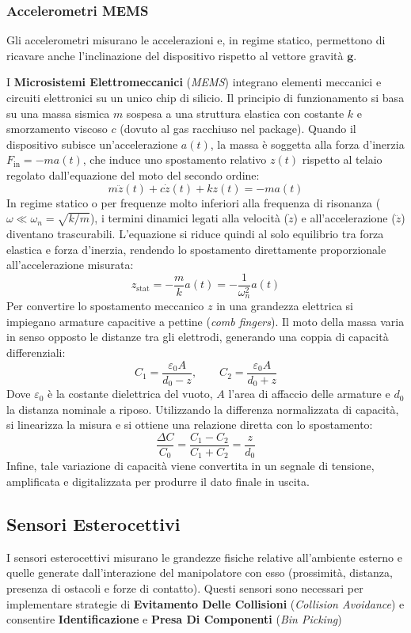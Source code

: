 ﻿\documentclass[11pt, a4paper]{article}
\begin{document}
\subsubsection{Accelerometri MEMS}
Gli accelerometri misurano le accelerazioni e, in regime statico, permettono di ricavare anche l'inclinazione del dispositivo rispetto al vettore gravità $\boldsymbol{g}$.

I \textbf{Microsistemi Elettromeccanici} (\textit{MEMS}) integrano elementi meccanici e circuiti elettronici su un unico chip di silicio. Il principio di funzionamento si basa su una massa sismica $m$ sospesa a una struttura elastica con costante $k$ e smorzamento viscoso $c$ (dovuto al gas racchiuso nel package). Quando il dispositivo subisce un'accelerazione $a(t)$, la massa è soggetta alla forza d'inerzia $F_{\text{in}} = -m a(t)$, che induce uno spostamento relativo $z(t)$ rispetto al telaio regolato dall'equazione del moto del secondo ordine:
\[
    m \ddot{z}(t) + c \dot{z}(t) + k z(t) = -m a(t)
\]
In regime statico o per frequenze molto inferiori alla frequenza di risonanza ($\omega \ll \omega_n = \sqrt{k/m}$), i termini dinamici legati alla velocità ($\dot{z}$) e all'accelerazione ($\ddot{z}$) diventano trascurabili. L'equazione si riduce quindi al solo equilibrio tra forza elastica e forza d'inerzia, rendendo lo spostamento direttamente proporzionale all'accelerazione misurata:
\[
    z_{\text{stat}} = -\frac{m}{k} a(t) = -\frac{1}{\omega_n^2} a(t)
\]
Per convertire lo spostamento meccanico $z$ in una grandezza elettrica si impiegano armature capacitive a pettine (\textit{comb fingers}). Il moto della massa varia in senso opposto le distanze tra gli elettrodi, generando una coppia di capacità differenziali:
\[
    C_1 = \frac{\varepsilon_0 A}{d_0 - z}, \qquad C_2 = \frac{\varepsilon_0 A}{d_0 + z}
\]
Dove $\varepsilon_0$ è la costante dielettrica del vuoto, $A$ l'area di affaccio delle armature e $d_0$ la distanza nominale a riposo.
Utilizzando la differenza normalizzata di capacità, si linearizza la misura e si ottiene una relazione diretta con lo spostamento:
\[
    \frac{\Delta C}{C_0} = \frac{C_1 - C_2}{C_1 + C_2} = \frac{z}{d_0}
\]
Infine, tale variazione di capacità viene convertita in un segnale di tensione, amplificata e digitalizzata per produrre il dato finale in uscita.
\newpage

\subsection{Sensori Esterocettivi}
I sensori esterocettivi misurano le grandezze fisiche relative all'ambiente esterno e quelle generate dall'interazione del manipolatore con esso (prossimità, distanza, presenza di ostacoli e forze di contatto). Questi sensori sono necessari per implementare strategie di \textbf{Evitamento Delle Collisioni} (\textit{Collision Avoidance}) e consentire \textbf{Identificazione} e \textbf{Presa Di Componenti} (\textit{Bin Picking})
\end{document}
